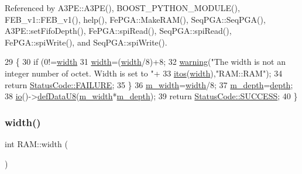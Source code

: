 Referenced by A3\+P\+E\+::\+A3\+P\+E(), B\+O\+O\+S\+T\+\_\+\+P\+Y\+T\+H\+O\+N\+\_\+\+M\+O\+D\+U\+L\+E(), F\+E\+B\+\_\+v1\+::\+F\+E\+B\+\_\+v1(), help(), Fe\+P\+G\+A\+::\+Make\+R\+A\+M(), Seq\+P\+G\+A\+::\+Seq\+P\+G\+A(), A3\+P\+E\+::set\+Fifo\+Depth(), Fe\+P\+G\+A\+::spi\+Read(), Seq\+P\+G\+A\+::spi\+Read(), Fe\+P\+G\+A\+::spi\+Write(), and Seq\+P\+G\+A\+::spi\+Write().


\begin{DoxyCode}
29                                                              \{
30   \textcolor{keywordflow}{if} (0!=\hyperlink{classRAM_a7770fe5392ee3f962acb14724849e01c}{width}%
31     \hyperlink{classRAM_a7770fe5392ee3f962acb14724849e01c}{width}=(\hyperlink{classRAM_a7770fe5392ee3f962acb14724849e01c}{width}/8)+8;
32     \hyperlink{classObject_a65cd4fda577711660821fd2cd5a3b4c9}{warning}(\textcolor{stringliteral}{"The width is not an integer number of octet. Width is set to "}+
33         \hyperlink{Tools_8h_af330027dbdafb9a30768b3613c553e60}{itos}(\hyperlink{classRAM_a7770fe5392ee3f962acb14724849e01c}{width}),\textcolor{stringliteral}{"RAM::RAM"});
34     \textcolor{keywordflow}{return} \hyperlink{classStatusCode_a6f565cbeadc76d14c72f047e5e85eb4ba3da73d4c469762eb9d3c960368252b26}{StatusCode::FAILURE};
35   \}
36   \hyperlink{classRAM_a9921651055311f968a843e2931f45164}{m\_width}=\hyperlink{classRAM_a7770fe5392ee3f962acb14724849e01c}{width}/8;
37   \hyperlink{classRAM_a7f23b0ac79ae5d954c968814c628ac53}{m\_depth}=\hyperlink{classRAM_aa36cbedb8a970a01ee07a9637553887f}{depth};
38   \hyperlink{classIOobject_af04fb94137c3d86849f478ac5afab5d1}{io}()->\hyperlink{classIOdata_a80bb230b61062b447db5832e43bf7b44}{defDataU8}(\hyperlink{classRAM_a9921651055311f968a843e2931f45164}{m\_width}*\hyperlink{classRAM_a7f23b0ac79ae5d954c968814c628ac53}{m\_depth});
39   \textcolor{keywordflow}{return} \hyperlink{classStatusCode_a6f565cbeadc76d14c72f047e5e85eb4badd0da38d3ba0d922efd1f4619bc37ad8}{StatusCode::SUCCESS};
40 \}
\end{DoxyCode}
\mbox{\label{classRAM_a7770fe5392ee3f962acb14724849e01c}} 
\subsubsection{\texorpdfstring{width()}{width()}}
{\footnotesize\ttfamily int R\+A\+M\+::width (\begin{DoxyParamCaption}{ }\end{DoxyParamCaption})\hspace{0.3cm}{\ttfamily [inline]}}



